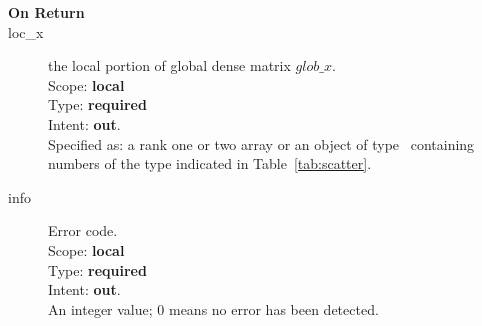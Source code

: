 \begin{description}
\item[\bf On Return] 
\item[loc\_x] the local portion of global dense matrix
$glob\_x$. \\
Scope: {\bf local} \\
Type: {\bf required}\\
Intent: {\bf out}.\\
Specified as: a rank one or two array  or an object of type \vdata\ containing numbers of the type
indicated in Table~\ref{tab:scatter}.
\item[info] Error code.\\
Scope: {\bf local} \\
Type: {\bf required} \\
Intent: {\bf out}.\\
An integer value; 0 means no error has been detected. 
\end{description}

